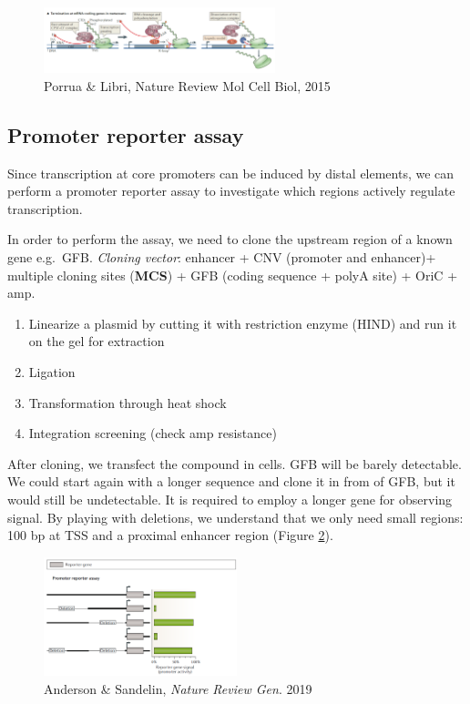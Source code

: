 \begin{figure}
\centering
\includegraphics[width=0.6\textwidth]{../_resources/Screenshot_2022-10-10_at_10-38-48.png}
\caption{Porrua \& Libri, Nature Review Mol Cell Biol, 2015}
\label{fig:torpedo}
\end{figure}

\hypertarget{promoter-reporter-assay}{%
\subsection{Promoter reporter assay}\label{promoter-reporter-assay}}

Since transcription at core promoters can be induced by distal elements, we can perform a promoter reporter assay to investigate which regions actively regulate transcription.

In order to perform the assay, we need to clone the upstream region of a known gene e.g.~GFB. \emph{Cloning vector}: enhancer + CNV (promoter and enhancer)+ multiple cloning sites (\textbf{MCS}) + GFB (coding sequence + polyA site) + OriC + amp.

\begin{enumerate}
\def\labelenumi{\arabic{enumi}.}
\tightlist
\item
  Linearize a plasmid by cutting it with restriction enzyme (HIND) and run it on the gel for extraction
\item
  Ligation
\item
  Transformation through heat shock
\item
  Integration screening (check amp resistance)
\end{enumerate}

After cloning, we transfect the compound in cells. GFB will be barely detectable. We could start again with a longer sequence and clone it in from of GFB, but it would still be undetectable. It is required to employ a longer gene for observing signal. By playing with deletions, we understand that we only need small regions: 100 bp at TSS and a proximal enhancer region (Figure \ref{fig:passay}).

\begin{figure}
\centering
\includegraphics[width=0.5\textwidth]{../_resources/Screenshot_2022-10-10_at_10-45-54.png}
\caption{Anderson \& Sandelin, \emph{Nature Review Gen}. 2019}
\label{fig:passay}
\end{figure}

